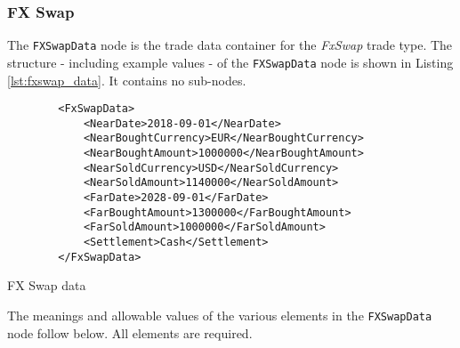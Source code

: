 \subsubsection{FX Swap}

The \lstinline!FXSwapData!  node is the trade data container for the \emph{FxSwap} trade type.  The structure -
including example values - of the \lstinline!FXSwapData!  node is shown in Listing 
\ref{lst:fxswap_data}. 
It contains no sub-nodes.

\begin{listing}[H]
\begin{verbatim}
        <FxSwapData>
            <NearDate>2018-09-01</NearDate>
            <NearBoughtCurrency>EUR</NearBoughtCurrency>
            <NearBoughtAmount>1000000</NearBoughtAmount>
            <NearSoldCurrency>USD</NearSoldCurrency>
            <NearSoldAmount>1140000</NearSoldAmount>
            <FarDate>2028-09-01</FarDate>
            <FarBoughtAmount>1300000</FarBoughtAmount>
            <FarSoldAmount>1000000</FarSoldAmount>
            <Settlement>Cash</Settlement>
        </FxSwapData>
\end{verbatim}
\caption{FX Swap data}
\label{lst:fxswap_data}
\end{listing}

The meanings and allowable values of the various elements in the \lstinline!FXSwapData!  node follow below.  All elements are required.

